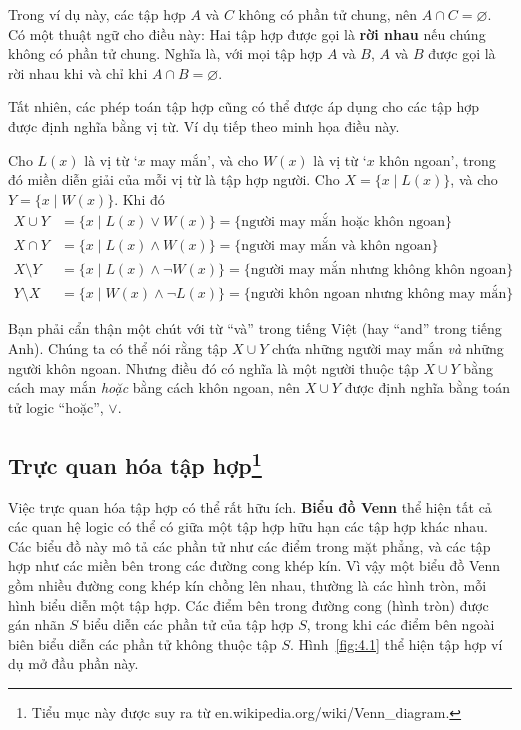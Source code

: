 Trong ví dụ này, các tập hợp $A$ và $C$ không có phần tử chung, nên $A \cap C = \varnothing$. Có một thuật ngữ cho điều này: Hai tập hợp được gọi là \textbf{rời nhau} nếu chúng không có phần tử chung. Nghĩa là, với mọi tập hợp $A$ và $B$, $A$ và $B$ được gọi là rời nhau khi và chỉ khi $A \cap B = \varnothing$.

Tất nhiên, các phép toán tập hợp cũng có thể được áp dụng cho các tập hợp được định nghĩa bằng vị từ. Ví dụ tiếp theo minh họa điều này.

\begin{example}
Cho $L(x)$ là vị từ `$x$ may mắn', và cho $W(x)$ là vị từ `$x$ khôn ngoan', trong đó miền diễn giải của mỗi vị từ là tập hợp người. Cho $X = \{x \mid L(x)\}$, và cho $Y = \{x \mid W(x)\}$. Khi đó
\begin{align*}
X \cup Y &= \{x \mid L(x) \lor W(x)\} = \{\text{người may mắn hoặc khôn ngoan}\} \\
X \cap Y &= \{x \mid L(x) \land W(x)\} = \{\text{người may mắn và khôn ngoan}\} \\
X \setminus Y &= \{x \mid L(x) \land \neg W(x)\} = \{\text{người may mắn nhưng không khôn ngoan}\} \\
Y \setminus X &= \{x \mid W(x) \land \neg L(x)\} = \{\text{người khôn ngoan nhưng không may mắn}\}
\end{align*}
\end{example}

\begin{warningbox}
Bạn phải cẩn thận một chút với từ ``và'' trong tiếng Việt (hay ``and'' trong tiếng Anh). Chúng ta có thể nói rằng tập $X \cup Y$ chứa những người may mắn \textit{và} những người khôn ngoan. Nhưng điều đó có nghĩa là một người thuộc tập $X \cup Y$ bằng cách may mắn \textit{hoặc} bằng cách khôn ngoan, nên $X \cup Y$ được định nghĩa bằng toán tử logic ``hoặc'', $\lor$.
\end{warningbox}

\subsection{Trực quan hóa tập hợp\protect\footnote{Tiểu mục này được suy ra từ en.wikipedia.org/wiki/Venn\_diagram.}}

Việc trực quan hóa tập hợp có thể rất hữu ích. \textbf{Biểu đồ Venn} thể hiện tất cả các quan hệ logic có thể có giữa một tập hợp hữu hạn các tập hợp khác nhau. Các biểu đồ này mô tả các phần tử như các điểm trong mặt phẳng, và các tập hợp như các miền bên trong các đường cong khép kín. Vì vậy một biểu đồ Venn gồm nhiều đường cong khép kín chồng lên nhau, thường là các hình tròn, mỗi hình biểu diễn một tập hợp. Các điểm bên trong đường cong (hình tròn) được gán nhãn $S$ biểu diễn các phần tử của tập hợp $S$, trong khi các điểm bên ngoài biên biểu diễn các phần tử không thuộc tập $S$. Hình~\ref{fig:4.1} thể hiện tập hợp ví dụ mở đầu phần này.

